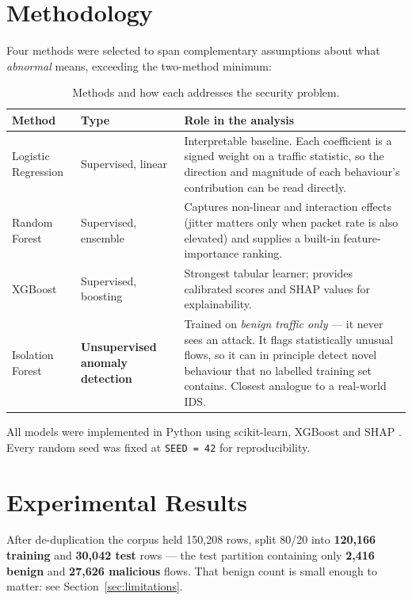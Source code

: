 \documentclass[11pt]{article}
\begin{document}
\section{Methodology}
Four methods were selected to span complementary assumptions about what
\emph{abnormal} means, exceeding the two-method minimum:

\begin{table}[h]
\centering
\caption{Methods and how each addresses the security problem.}
\label{tab:methods}
\begin{tabular}{@{} p{} p{} p{} @{}}
\toprule
\textbf{Method} & \textbf{Type} & \textbf{Role in the analysis} \\
\midrule
Logistic Regression & Supervised, linear & Interpretable baseline. Each
coefficient is a signed weight on a traffic statistic, so the direction and
magnitude of each behaviour's contribution can be read directly. \\
\addlinespace
Random Forest & Supervised, ensemble & Captures non-linear and interaction
effects (jitter matters only when packet rate is also elevated) and supplies a
built-in feature-importance ranking. \\
\addlinespace
XGBoost & Supervised, boosting & Strongest tabular learner; provides
calibrated scores and SHAP values for explainability. \\
\addlinespace
Isolation Forest & \textbf{Unsupervised anomaly detection} & Trained on
\emph{benign traffic only} --- it never sees an attack. It flags statistically
unusual flows, so it can in principle detect novel behaviour that no labelled
training set contains. Closest analogue to a real-world IDS. \\
\bottomrule
\end{tabular}
\end{table}

All models were implemented in Python using scikit-learn, XGBoost and SHAP
\cite{pedregosa2011sklearn, chen2017xgboost, liu2008isolation,
lundberg2017shap, breiman2001random}. Every random seed was fixed at
\texttt{SEED = 42} for reproducibility.

\section{Experimental Results}\label{sec:results}
After de-duplication the corpus held 150,208 rows, split 80/20 into
\textbf{120,166 training} and \textbf{30,042 test} rows --- the test partition
containing only \textbf{2,416 benign} and \textbf{27,626 malicious} flows. That
benign count is small enough to matter: see Section~\ref{sec:limitations}.
\end{document}
